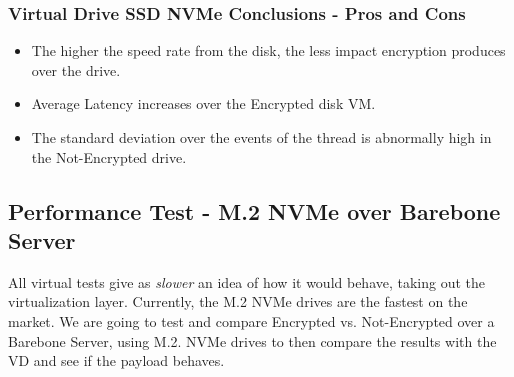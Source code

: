 \subsubsection{Virtual Drive SSD NVMe Conclusions - Pros and Cons}
\begin{itemize}
  \item The higher the speed rate from the disk, the less impact encryption produces over the drive.
  \item Average Latency increases over the Encrypted disk VM.
  \item The standard deviation over the events of the thread is abnormally high in the Not-Encrypted drive.
\end{itemize}

\newpage
\subsection{Performance Test - M.2 NVMe over Barebone Server}
All virtual tests give as \textit{slower} an idea of how it would behave, taking out the virtualization layer. Currently, the M.2 NVMe drives are the fastest on the market. We are going to test and compare Encrypted vs. Not-Encrypted over a Barebone Server, using M.2. NVMe drives to then compare the results with the VD and see if the payload behaves.
